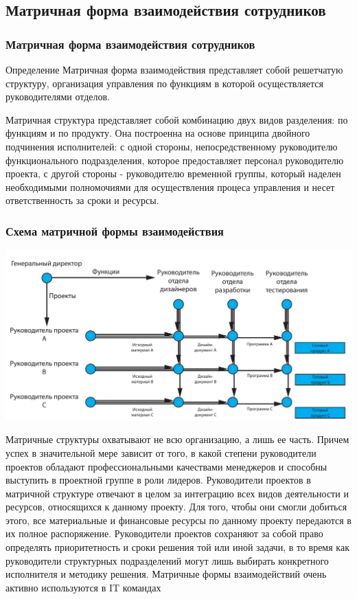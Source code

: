 \documentclass{../industrial-development}
\begin{document}
\subsection{Матричная форма взаимодействия сотрудников}

\begin{frame} \frametitle{Матричная форма взаимодействия сотрудников}
  \begin{block}{Определение}
	\alert{Матричная форма взаимодействия} представляет собой решетчатую структуру, организация управления по функциям в которой осуществляется руководителями отделов.
  \end{block}
\end{frame}

\lecturenotes
Матричная структура представляет собой комбинацию двух видов разделения: по функциям и по продукту. Она построенна на основе принципа двойного подчинения исполнителей: с одной стороны, непосредственному руководителю функционального подразделения, которое предоставляет персонал руководителю проекта, с другой стороны  - руководителю временной группы, который наделен необходимыми полномочиями для осуществления процеса управления и несет ответственность за сроки и ресурсы.

\begin{frame} \frametitle{Схема матричной формы взаимодействия}

\begin{block}{}
	\centerline{\includegraphics[width=1\textwidth]{matrix.pdf}}
\end{block}

\end{frame}

\lecturenotes
Матричные структуры охватывают не всю организацию, а лишь ее часть. Причем успех в значительной мере зависит от того, в какой степени руководители проектов обладают профессиональными качествами менеджеров и способны выступить в проектной группе в роли лидеров.
Руководители проектов в матричной структуре отвечают в целом за интеграцию всех видов деятельности и ресурсов, относящихся к данному проекту. Для того, чтобы они смогли добиться этого, все материальные и финансовые ресурсы по данному проекту передаются в их полное распоряжение. Руководители проектов сохраняют за собой право определять приоритетность и сроки решения той или иной задачи, в то время как руководители структурных подразделений могут лишь выбирать конкретного исполнителя и методику решения.
Матричные формы взаимодействий очень активно используются в IT  командах
\end{document}
